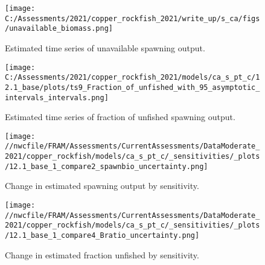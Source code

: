 \documentclass[11pt,
  english,
  a4paper,
]{article}
\begin{document}
\begin{figure}
\centering
\texttt{[image: C:/Assessments/2021/copper\_rockfish\_2021/write\_up/s\_ca/figs/unavailable\_biomass.png]}
\caption{Estimated time series of unavailable spawning output.\label{fig:ssb-unavailable}}
\end{figure}

\tagmcend\tagstructend


\begin{figure}
\centering
\texttt{[image: C:/Assessments/2021/copper\_rockfish\_2021/models/ca\_s\_pt\_c/12.1\_base/plots/ts9\_Fraction\_of\_unfished\_with\_95\_asymptotic\_intervals\_intervals.png]}
\caption{Estimated time series of fraction of unfished spawning output.\label{fig:depl}}
\end{figure}

\tagmcend\tagstructend


\begin{figure}
\centering
\texttt{[image: //nwcfile/FRAM/Assessments/CurrentAssessments/DataModerate\_2021/copper\_rockfish/models/ca\_s\_pt\_c/\_sensitivities/\_plots/12.1\_base\_1\_compare2\_spawnbio\_uncertainty.png]}
\caption{Change in estimated spawning output by sensitivity.\label{fig:sens-ssb-1}}
\end{figure}

\tagmcend\tagstructend


\begin{figure}
\centering
\texttt{[image: //nwcfile/FRAM/Assessments/CurrentAssessments/DataModerate\_2021/copper\_rockfish/models/ca\_s\_pt\_c/\_sensitivities/\_plots/12.1\_base\_1\_compare4\_Bratio\_uncertainty.png]}
\caption{Change in estimated fraction unfished by sensitivity.\label{fig:sens-depl-1}}
\end{figure}

\tagmcend\tagstructend

\end{document}
